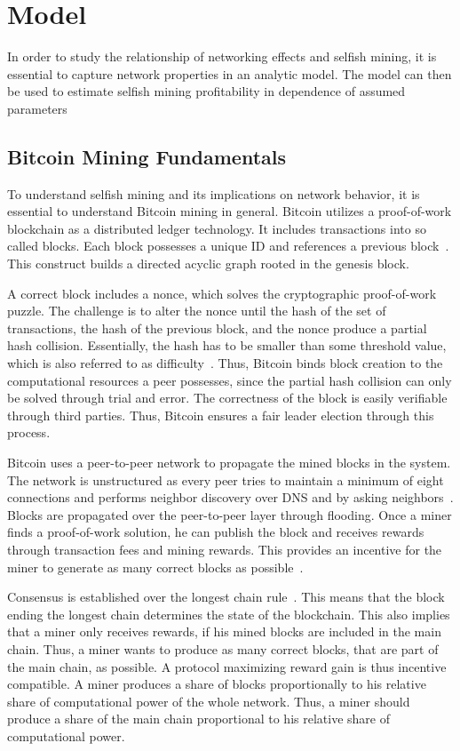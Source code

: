 \chapter{Model}\label{chap:model}
In order to study the relationship of networking effects and selfish mining, it is essential to capture network properties in an analytic model. The model can then be used to estimate selfish mining profitability in dependence of assumed parameters
\section{Bitcoin Mining Fundamentals}
To understand selfish mining and its implications on network behavior, it is essential to understand Bitcoin mining in general.
Bitcoin utilizes a proof-of-work blockchain as a distributed ledger technology.
It includes transactions into so called blocks. Each block possesses a unique ID and references a previous block~\cite{tschorsch}. This construct builds a directed acyclic graph rooted in the genesis block.

A correct block includes a nonce, which solves the cryptographic proof-of-work puzzle. The challenge is to alter the nonce until the hash of the set of transactions, the hash of the previous block, and the nonce produce a partial hash collision. Essentially, the hash has to be smaller than some threshold value, which is also referred to as difficulty~\cite{tschorsch}.
Thus, Bitcoin binds block creation to the computational resources a peer possesses, since the partial hash collision can only be solved through trial and error. The correctness of the block is easily verifiable through third parties. Thus, Bitcoin ensures a fair leader election through this process.

Bitcoin uses a peer-to-peer network to propagate the mined blocks in the system. The network is unstructured as every peer tries to maintain a minimum of eight connections and performs neighbor discovery over DNS and by asking neighbors~\cite{tschorsch}. Blocks are propagated over the peer-to-peer layer through flooding.
Once a miner finds a proof-of-work solution, he can publish the block and receives rewards through transaction fees and mining rewards. This provides an incentive for the miner to generate as many correct blocks as possible~\cite{1}.

Consensus is established over the longest chain rule~\cite{1}. This means that the block ending the longest chain determines the state of the blockchain. This also implies that a miner only receives rewards, if his mined blocks are included in the main chain. Thus, a miner wants to produce as many correct blocks, that are part of the main chain, as possible. A protocol maximizing reward gain is thus incentive compatible.
A miner produces a share of blocks proportionally to his relative share of computational power of the whole network. Thus, a miner should produce a share of the main chain proportional to his relative share of computational power.

